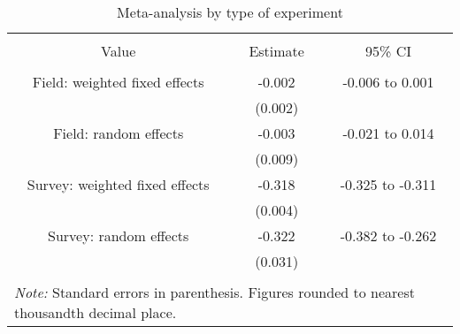 
\begin{table}[!htbp] \centering 
  \caption{Meta-analysis by type of experiment} 
  \label{meta_type} 
\begin{tabular}{@{\extracolsep{30pt}} ccc} 
\\[-1.8ex]\hline 
\hline \\[-1.8ex] 
Value & Estimate & 95\% CI \\ 
\hline \\[-1.8ex] 
Field: weighted fixed effects  & -0.002 & -0.006 to 0.001 \\ 
 & (0.002) &  \\ 
Field: random effects & -0.003 & -0.021 to 0.014 \\ 
 & (0.009) &  \\ 
Survey: weighted fixed effects  & -0.318 & -0.325 to -0.311 \\ 
 & (0.004) &  \\ 
Survey: random effects & -0.322 & -0.382 to -0.262 \\ 
 & (0.031) &  \\ 
\hline \\[-1.8ex] 
\multicolumn{3}{l}{\parbox[t]{\textwidth}{\footnotesize \textit{Note:} Standard errors in parenthesis. Figures rounded to nearest thousandth decimal place.}} \\ 
\end{tabular} 
\end{table} 
